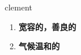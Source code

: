 
\begin{frame}
{\huge clement}
\begin{center}
\begin{enumerate}\Large
  \item \textbf{宽容的，善良的}
  \item \textbf{气候温和的}
\end{enumerate}
\end{center}
\end{frame}
